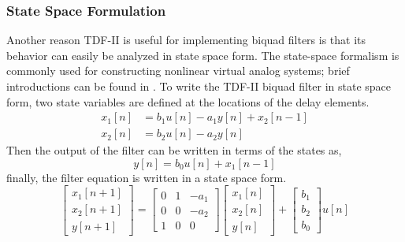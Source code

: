 \documentclass[twoside,a4paper]{article}
\begin{document}
\subsubsection{State Space Formulation}

Another reason TDF-II is useful for implementing biquad filters
is that its behavior can easily be analyzed in state space form.
The state-space formalism is commonly used for constructing nonlinear
virtual analog systems; brief introductions can be found in
\cite{lightweightVA,Yeh}. To write the TDF-II biquad filter in
state space form, two state variables are defined at the locations
of the delay elements.
%
\begin{equation}
    \begin{split}
        x_1[n] &= b_1 u[n] - a_1 y[n] + x_2[n-1] \\
        x_2[n] &= b_2 u[n] - a_2 y[n]
    \end{split}
    \label{eq:bq_lin_states}
\end{equation}
%
Then the output of the filter can be written in terms of the states
as,
%
\begin{equation}
    y[n] = b_0 u[n] + x_1[n-1]
    \label{eq:state_output_lin}
\end{equation}
%
finally, the filter equation is written in a state space form.
%
\begin{equation}
    \begin{bmatrix} x_1[n+1] \\ x_2[n+1] \\ y[n+1] \end{bmatrix} =
    \begin{bmatrix} 0& 1& -a_1\\ 0& 0& -a_2\\ 1& 0& 0 \end{bmatrix}
    \begin{bmatrix} x_1[n] \\ x_2[n] \\ y[n] \end{bmatrix}
    + \begin{bmatrix} b_1\\ b_2\\ b_0 \end{bmatrix} u[n]
    \label{eq:bq_lin_state_spaces}
\end{equation}
\end{document}
